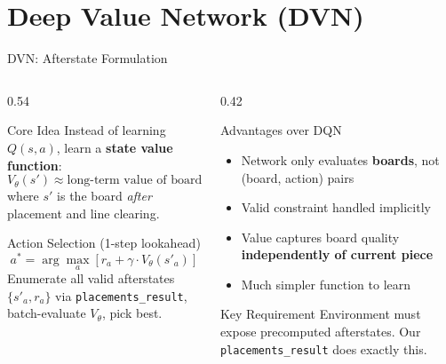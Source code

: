 \documentclass[aspectratio=169,10pt]{beamer}
\begin{document}
\section{Deep Value Network (DVN)}

\begin{frame}{DVN: Afterstate Formulation}
\begin{columns}[T]
\begin{column}{0.54\textwidth}
\begin{block}{Core Idea}
Instead of learning $Q(s, a)$, learn a \textbf{state value function}:
\[
V_\theta(s') \approx \text{long-term value of board } s'
\]
where $s'$ is the board \emph{after} placement and line clearing.
\end{block}

\vspace{0.5em}
\begin{block}{Action Selection (1-step lookahead)}
\[
a^* = \arg\max_a \left[ r_a + \gamma \cdot V_\theta(s'_a) \right]
\]
Enumerate all valid afterstates $\{s'_a, r_a\}$ via \texttt{placements\_result}, batch-evaluate $V_\theta$, pick best.
\end{block}
\end{column}

\begin{column}{0.42\textwidth}
\begin{exampleblock}{Advantages over DQN}
\begin{itemize}
    \item Network only evaluates \textbf{boards}, not (board, action) pairs
    \item Valid constraint handled implicitly
    \item Value captures board quality \textbf{independently of current piece}
    \item Much simpler function to learn
\end{itemize}
\end{exampleblock}

\begin{alertblock}{Key Requirement}
Environment must expose precomputed afterstates. Our \texttt{placements\_result} does exactly this.
\end{alertblock}
\end{column}
\end{columns}
\end{frame}
\end{document}
